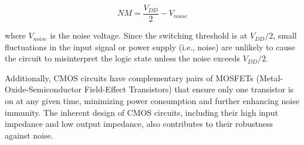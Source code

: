 \[
NM = \frac{V_{DD}}{2} - V_{noise}
\]

where \(V_{noise}\) is the noise voltage. Since the switching threshold is at \(V_{DD}/2\), small fluctuations in the input signal or power supply (i.e., noise) are unlikely to cause the circuit to misinterpret the logic state unless the noise exceeds \(V_{DD}/2\).

Additionally, CMOS circuits have complementary pairs of MOSFETs (Metal-Oxide-Semiconductor Field-Effect Transistors) that ensure only one transistor is on at any given time, minimizing power consumption and further enhancing noise immunity. The inherent design of CMOS circuits, including their high input impedance and low output impedance, also contributes to their robustness against noise.

